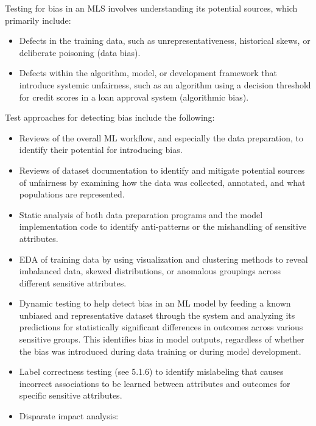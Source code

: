 \documentclass[
  letterpaper,
  DIV=11,
  numbers=noendperiod,
  oneside]{scrreprt}
\begin{document}
\begin{tcolorbox}
Testing for bias{} in an MLS involves understanding its potential
sources, which primarily include:

\begin{itemize}
\item
  Defects in the training data, such as unrepresentativeness, historical
  skews, or deliberate poisoning (data bias).
\item
  Defects within the algorithm, model, or development framework that
  introduce systemic unfairness, such as an algorithm using a decision
  threshold for credit scores in a loan approval system (algorithmic
  bias).
\end{itemize}

Test approaches for detecting bias include the following:

\begin{itemize}
\item
  Review{}s of the overall ML workflow, and especially the data
  preparation, to identify their potential for introducing bias.
\item
  Reviews of dataset documentation to identify and mitigate potential
  sources of unfairness by examining how the data was collected,
  annotated, and what populations are represented.
\item
  Static analysis{} of both data preparation programs and the model
  implementation code to identify anti-patterns or the mishandling of
  sensitive attributes.
\item
  EDA{} of training data by using visualization and clustering methods
  to reveal imbalanced data, skewed distributions, or anomalous
  groupings across different sensitive attributes.
\item
  Dynamic testing{} to help detect bias in an ML model by feeding a
  known unbiased and representative dataset through the system and
  analyzing its predictions for statistically significant differences in
  outcomes across various sensitive groups. This identifies bias in
  model outputs, regardless of whether the bias was introduced during
  data training or during model development.
\item
  Label correctness testing{} (see 5.1.6) to identify mislabeling that
  causes incorrect associations to be learned between attributes and
  outcomes for specific sensitive attributes.
\item
  Disparate impact analysis{}:


\end{itemize}
\end{tcolorbox}
\end{document}

